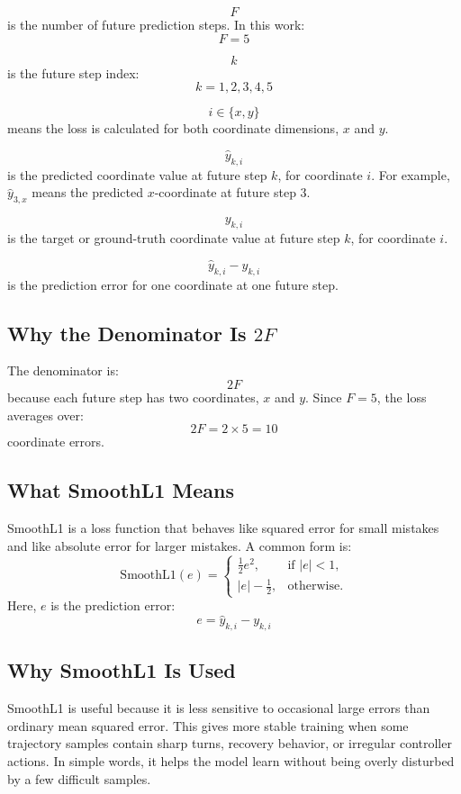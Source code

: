 \documentclass[11pt,a4paper]{article}
\begin{document}
\[
    F
\]
is the number of future prediction steps. In this work:
\[
    F = 5
\]

\[
    k
\]
is the future step index:
\[
    k = 1,2,3,4,5
\]

\[
    i \in \{x,y\}
\]
means the loss is calculated for both coordinate dimensions, \(x\) and \(y\).

\[
    \hat{y}_{k,i}
\]
is the predicted coordinate value at future step \(k\), for coordinate \(i\).
For example, \(\hat{y}_{3,x}\) means the predicted \(x\)-coordinate at future
step 3.

\[
    y_{k,i}
\]
is the target or ground-truth coordinate value at future step \(k\), for
coordinate \(i\).

\[
    \hat{y}_{k,i} - y_{k,i}
\]
is the prediction error for one coordinate at one future step.

\subsection*{Why the Denominator Is \(2F\)}
The denominator is:
\[
    2F
\]
because each future step has two coordinates, \(x\) and \(y\). Since \(F=5\),
the loss averages over:
\[
    2F = 2 \times 5 = 10
\]
coordinate errors.

\subsection*{What SmoothL1 Means}
SmoothL1 is a loss function that behaves like squared error for small mistakes
and like absolute error for larger mistakes. A common form is:
\[
\mathrm{SmoothL1}(e) =
\begin{cases}
    \frac{1}{2}e^2, & \text{if } |e| < 1, \\
    |e| - \frac{1}{2}, & \text{otherwise.}
\end{cases}
\]
Here, \(e\) is the prediction error:
\[
    e = \hat{y}_{k,i} - y_{k,i}
\]

\subsection*{Why SmoothL1 Is Used}
SmoothL1 is useful because it is less sensitive to occasional large errors than
ordinary mean squared error. This gives more stable training when some
trajectory samples contain sharp turns, recovery behavior, or irregular
controller actions. In simple words, it helps the model learn without being
overly disturbed by a few difficult samples.
\end{document}
